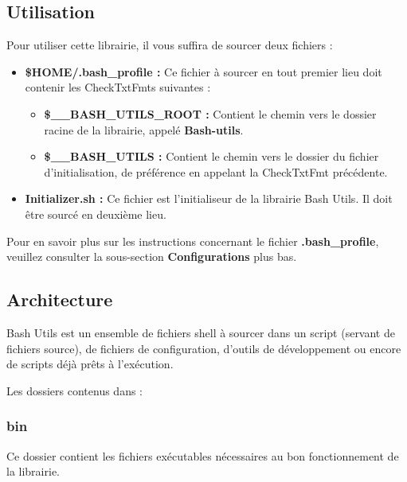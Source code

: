 \documentclass[a4paper,10pt]{article}
\begin{document}
\subsection{Utilisation}\color{white}
Pour utiliser cette librairie, il vous suffira de sourcer deux fichiers :
\begin{itemize}
    \item \color{orange}\textbf{\$HOME\color{lime}/.bash\_profile\color{white} :} \color{white} Ce fichier à sourcer en tout premier lieu doit contenir les CheckTxtFmts suivantes :
    \begin{itemize}
        \item \color{orange}\textbf{\$\_\_BASH\_UTILS\_ROOT\color{white} :} \color{white} Contient le chemin vers le dossier racine de la librairie, appelé \color{lime}\textbf{Bash-utils}\color{white}.
        \item \color{orange}\textbf{\$\_\_BASH\_UTILS\color{white} :} \color{white} Contient le chemin vers le dossier du fichier d'initialisation, de préférence en appelant la CheckTxtFmt précédente.\linebreak
    \end{itemize}

    \item \color{lime}\textbf{Initializer.sh\color{white} :} \color{white} Ce fichier est l'initialiseur de la librairie Bash Utils. Il doit être sourcé en deuxième lieu.

\end{itemize}
	Pour en savoir plus sur les instructions concernant le fichier \color{lime}\textbf{.bash\_profile}\color{white}, veuillez consulter la sous-section \textbf{Configurations} plus bas.


\color{green}
\subsection{Architecture}\color{white}
Bash Utils est un ensemble de fichiers shell à sourcer dans un script (servant de fichiers source), de fichiers de configuration, d'outils de développement ou encore de scripts déjà prêts à l'exécution.

Les dossiers contenus dans  :
\color{blue}
\subsubsection{bin}\color{white}
Ce dossier contient les fichiers exécutables nécessaires au bon fonctionnement de la librairie.
\end{document}
